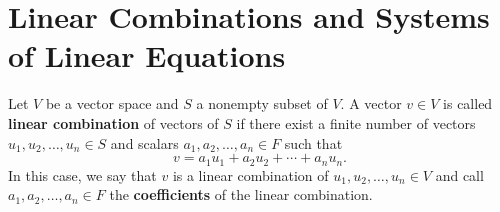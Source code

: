 \section{Linear Combinations and Systems of Linear Equations}

\begin{definition}
   Let \( V  \) be a vector space and \( S  \) a nonempty subset of \( V  \). A vector \( v \in V  \) is called \textbf{linear combination} of vectors of \( S  \) if there exist a finite number of vectors \( u_{1} , u_{2}, \dots, u_{n} \in S  \) and scalars \( a_{1}, a_{2} , \dots, a_{n} \in F  \) such that 
   \[  v = a_{1} u_{1} + a_{2} u_{2} + \cdots + a_{n} u_{n}. \] In this case, we say that \( v \) is a linear combination of \( u_{1} , u_{2} , \dots, u_{n} \in V   \) and call \( a_{1} , a_{2} , \dots, a_{n} \in F   \) the \textbf{coefficients} of the linear combination. 
\end{definition}

